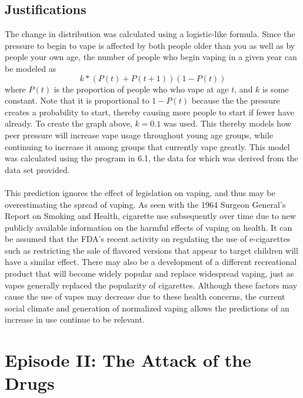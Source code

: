 \documentclass{article}
\begin{document}
\subsection{Justifications}
The change in distribution was calculated using a logistic-like formula. Since the pressure to begin to vape is affected by both people older than you as well as by people your own age, the number of people who begin vaping in a given year can be modeled as 
\[
k*(P(t)+P(t+1))(1-P(t))
\]
where $P(t)$ is the proportion of people who who vape at age $t$, and $k$ is some constant\cite{cdcinfographic}. Note that it is proportional to $1-P(t)$ because the the pressure creates a probability to start, thereby causing more people to start if fewer have already. To create the graph above, $k=0.1$ was used. This thereby models how peer pressure will increase vape usage throughout young age groups, while continuing to increase it among groups that currently vape greatly. This model was calculated using the program in 6.1, the data for which was derived from the data set provided.
\\\\
This prediction ignores the effect of legislation on vaping, and thus may be overestimating the spread of vaping\cite{cdcburdentobacco}. As seen with the 1964 Surgeon General's Report on Smoking and Health\cite{napedu}, cigarette use subsequently over time due to new publicly available information on the harmful effects of vaping on health. It can be assumed that the FDA's recent activity on regulating the use of e-cigarettes such as restricting the sale of flavored versions that appear to target children will have a similar effect\cite{forbestrump}. There may also be a development of a different recreational product that will become widely popular and replace widespread vaping, just as vapes generally replaced the popularity of cigarettes. Although these factors may cause the use of vapes may decrease due to these health concerns, the current social climate and generation of normalized vaping allows the predictions of an increase in use continue to be relevant. 
\newpage

\section{Episode II: The Attack of the Drugs}
\end{document}
